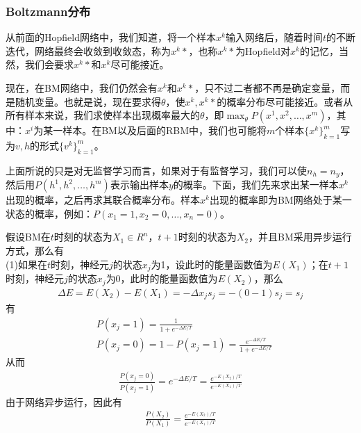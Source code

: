         \subsubsection{Boltzmann分布}
            \par
            从前面的Hopfield网络中，我们知道，将一个样本$x^k$输入网络后，随着时间$t$的不断迭代，网络最终会收敛到收敛态，称为$x^k*$，也称$x^k*$为Hopfield对$x^k$的记忆，当然，我们会要求$x^k*$和$x^k$尽可能接近。
            \par
            现在，在BM网络中，我们仍然会有$x^k$和$x^k*$，只不过二者都不再是确定变量，而是随机变量。也就是说，现在要求得$\theta$，使$x^k,x^k*$的概率分布尽可能接近。或者从所有样本来说，我们求使样本出现概率最大的$\theta$，即$\max_\theta P(x^1,x^2,\dots,x^m)$，其中：$x^i$为某一样本。在BM以及后面的RBM中，我们也可能将$m$个样本$\{x^k\}_{k=1}^m$写为$v,h$的形式$\{v^k\}_{k=1}^m$。
            \par
            上面所说的只是对无监督学习而言，如果对于有监督学习，我们可以使$n_h = n_y$，然后用$P(h^1,h^2,\dots,h^{m})$表示输出样本$y$的概率。下面，我们先来求出某一样本$x^k$出现的概率，之后再求其联合概率分布。样本$x^k$出现的概率即为BM网络处于某一状态的概率，例如：$P(x_1 = 1,x_2=0,\dots,x_n=0)$。
            \par
            假设BM在$t$时刻的状态为$X_1\in R^n$，$t+1$时刻的状态为$X_2$，并且BM采用异步运行方式，那么有\\
            (1)如果在$t$时刻，神经元$j$的状态$x_j$为1，设此时的能量函数值为$E(X_1)$；在$t+1$时刻，神经元$j$的状态$x_j$为0，此时的能量函数值为$E(X_2)$，那么
            \begin{align*}
            \Delta E = E(X_2) - E(X_1)= -\Delta x_j s_j = - (0-1)s_j = s_j
            \end{align*}
            有
            \begin{align*}
            & P(x_j = 1)  = \frac{1}{1+e^{-\Delta E/T}}\\
            & P(x_j = 0) = 1-P(x_j = 1)  = \frac{e^{-\Delta E/T}}{1+e^{-\Delta E/T}}
            \end{align*}
            从而
            \begin{align*}
            \frac{P(x_j = 0)}{P(x_j = 1)} = e^{-\Delta E/T} = \frac{e^{- E(X_2)/T}}{e^{- E(X_1)/T}}
            \end{align*}
            由于网络异步运行，因此有
            \begin{align*}
            \frac{P(X_2)}{P(X_1)} = \frac{e^{- E(X_2)/T}}{e^{- E(X_1)/T}}
            \end{align*}
